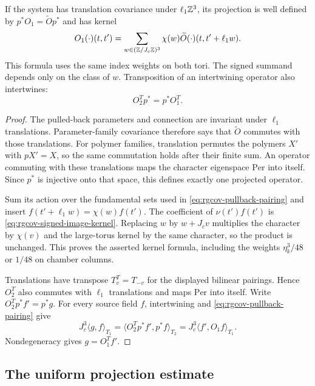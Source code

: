 \begin{proposition}\label{prop:rgcov-kernel-projection}
If the system has translation covariance under
$\ell_1\mathbb Z^3$, its projection is well defined by
$p^*O_1=\widetilde Op^*$ and has kernel
\begin{equation}\label{eq:rgcov-signed-image-kernel}
 O_1(\cdot)(t,t')
  =\sum_{w\in(\mathbb Z/J_c\mathbb Z)^3}\chi(w)
                       \widetilde O(\cdot)(t,t'+\ell_1w).
\end{equation}
This formula uses the same index weights on both tori.
The signed summand depends only on the class of $w$.
Transposition of an intertwining operator also intertwines:
\begin{equation}\label{eq:rgcov-transpose-intertwining}
                          O_2^Tp^*=p^*O_1^T.
\end{equation}
\end{proposition}

\begin{proof}
The pulled-back parameters and connection are invariant
under $\ell_1$ translations. Parameter-family covariance
therefore says that $\widetilde O$ commutes with those
translations. For polymer families, translation permutes
the polymers $X'$ with $pX'=X$, so the same commutation
holds after their finite sum.
An operator commuting with these translations maps the
character eigenspace $\mathrm{Per}$ into itself.
Since $p^*$ is injective onto that space, this defines
exactly one projected operator.

Sum its action over the fundamental sets used in
\eqref{eq:rgcov-pullback-pairing} and insert
$f(t'+\ell_1w)=\chi(w)f(t')$.
The coefficient of $\nu(t')f(t')$ is
\eqref{eq:rgcov-signed-image-kernel}.
Replacing $w$ by $w+J_cv$ multiplies the character
by $\chi(v)$ and the large-torus kernel by the same
character, so the product is unchanged.
This proves the asserted kernel formula, including
the weights $\eta_k^3/48$ or $1/48$ on chamber columns.

Translations have transpose $T_v^T=T_{-v}$ for the
displayed bilinear pairings. Hence $O_2^T$ also commutes
with $\ell_1$ translations and maps $\mathrm{Per}$
into itself. Write $O_2^Tp^*f'=p^*g$.
For every source field $f$, intertwining and
\eqref{eq:rgcov-pullback-pairing} give
\[
 J_c^3\langle g,f\rangle_{T_1}
 =\langle O_2^Tp^*f',p^*f\rangle_{T_2}
 =J_c^3\langle f',O_1f\rangle_{T_1}.
\]
Nondegeneracy gives $g=O_1^Tf'$.
\end{proof}

\subsection{The uniform projection estimate}
\label{subsec:rgcov-projection-estimates}

